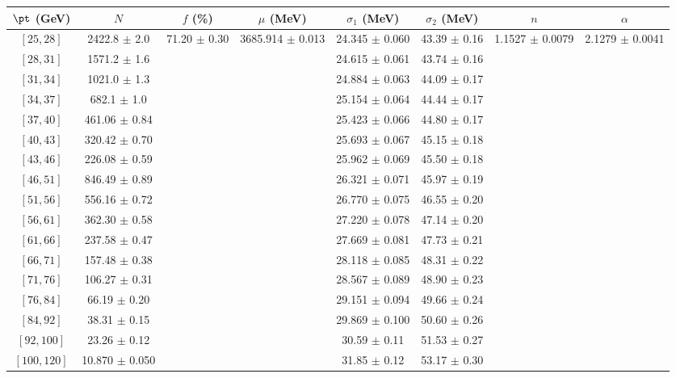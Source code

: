 \begin{tabular}{c||c|c|c|c|c|c|c}
$\pt$ (GeV) & $N$ & $f$ (\%) & $\mu$ (MeV) & $\sigma_1$ (MeV) & $\sigma_2$ (MeV) & $n$ & $\alpha$ \\
\hline
$[25, 28]$ & 2422.8 $\pm$ 2.0 & \multirow{17}{*}{71.20 $\pm$ 0.30} & \multirow{17}{*}{3685.914 $\pm$ 0.013} & 24.345 $\pm$ 0.060 & 43.39 $\pm$ 0.16 & \multirow{17}{*}{1.1527 $\pm$ 0.0079} & \multirow{17}{*}{2.1279 $\pm$ 0.0041}\\
$[28, 31]$ & 1571.2 $\pm$ 1.6 &  &  & 24.615 $\pm$ 0.061 & 43.74 $\pm$ 0.16 &  & \\
$[31, 34]$ & 1021.0 $\pm$ 1.3 &  &  & 24.884 $\pm$ 0.063 & 44.09 $\pm$ 0.17 &  & \\
$[34, 37]$ & 682.1 $\pm$ 1.0 &  &  & 25.154 $\pm$ 0.064 & 44.44 $\pm$ 0.17 &  & \\
$[37, 40]$ & 461.06 $\pm$ 0.84 &  &  & 25.423 $\pm$ 0.066 & 44.80 $\pm$ 0.17 &  & \\
$[40, 43]$ & 320.42 $\pm$ 0.70 &  &  & 25.693 $\pm$ 0.067 & 45.15 $\pm$ 0.18 &  & \\
$[43, 46]$ & 226.08 $\pm$ 0.59 &  &  & 25.962 $\pm$ 0.069 & 45.50 $\pm$ 0.18 &  & \\
$[46, 51]$ & 846.49 $\pm$ 0.89 &  &  & 26.321 $\pm$ 0.071 & 45.97 $\pm$ 0.19 &  & \\
$[51, 56]$ & 556.16 $\pm$ 0.72 &  &  & 26.770 $\pm$ 0.075 & 46.55 $\pm$ 0.20 &  & \\
$[56, 61]$ & 362.30 $\pm$ 0.58 &  &  & 27.220 $\pm$ 0.078 & 47.14 $\pm$ 0.20 &  & \\
$[61, 66]$ & 237.58 $\pm$ 0.47 &  &  & 27.669 $\pm$ 0.081 & 47.73 $\pm$ 0.21 &  & \\
$[66, 71]$ & 157.48 $\pm$ 0.38 &  &  & 28.118 $\pm$ 0.085 & 48.31 $\pm$ 0.22 &  & \\
$[71, 76]$ & 106.27 $\pm$ 0.31 &  &  & 28.567 $\pm$ 0.089 & 48.90 $\pm$ 0.23 &  & \\
$[76, 84]$ & 66.19 $\pm$ 0.20 &  &  & 29.151 $\pm$ 0.094 & 49.66 $\pm$ 0.24 &  & \\
$[84, 92]$ & 38.31 $\pm$ 0.15 &  &  & 29.869 $\pm$ 0.100 & 50.60 $\pm$ 0.26 &  & \\
$[92, 100]$ & 23.26 $\pm$ 0.12 &  &  & 30.59 $\pm$ 0.11 & 51.53 $\pm$ 0.27 &  & \\
$[100, 120]$ & 10.870 $\pm$ 0.050 &  &  & 31.85 $\pm$ 0.12 & 53.17 $\pm$ 0.30 &  & \\
\end{tabular}
